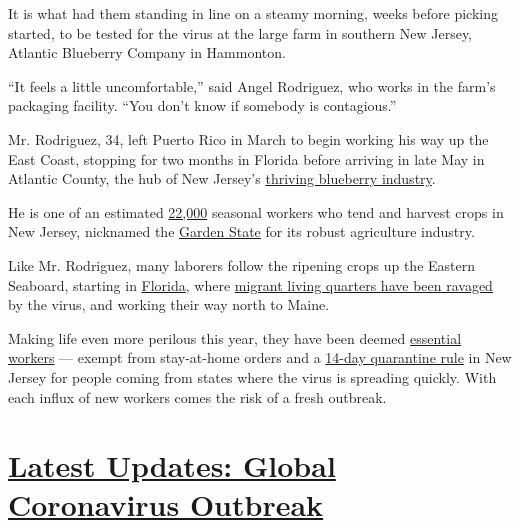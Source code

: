 It is what had them standing in line on a steamy morning, weeks before
picking started, to be tested for the virus at the large farm in
southern New Jersey, Atlantic Blueberry Company in Hammonton.

``It feels a little uncomfortable,'' said Angel Rodriguez, who works in
the farm's packaging facility. ``You don't know if somebody is
contagious.''

Mr. Rodriguez, 34, left Puerto Rico in March to begin working his way up
the East Coast, stopping for two months in Florida before arriving in
late May in Atlantic County, the hub of New Jersey's
\href{https://www.nj.gov/agriculture/news/press/2019/approved/press190701.html\#:~:text=Blueberries\%20were\%20the\%20No.,on\%209\%2C000\%20acres\%20last\%20year.}{thriving
blueberry industry}.

He is one of an estimated
\href{https://www.ncbi.nlm.nih.gov/pmc/articles/PMC4040280/\#R10}{22,000}
seasonal workers who tend and harvest crops in New Jersey, nicknamed the
\href{https://www.state.nj.us/nj/about/facts/nickname/\#:~:text=Abraham\%20Browning\%20of\%20Camden\%20is,the\%20nickname\%20the\%20Garden\%20State.\&text=Browning\%20said\%20that\%20our\%20Garden,The\%20name\%20stuck\%20ever\%20since.}{Garden
State} for its robust agriculture industry.

Like Mr. Rodriguez, many laborers follow the ripening crops up the
Eastern Seaboard, starting in
\href{https://www.nytimes3xbfgragh.onion/2020/06/25/us/coronavirus-florida-texas-california-arizona.html}{Florida},
where
\href{https://www.nytimes3xbfgragh.onion/2020/06/18/us/florida-coronavirus-immokalee-farmworkers.html}{migrant
living quarters have been ravaged} by the virus, and working their way
north to Maine.

Making life even more perilous this year, they have been deemed
\href{https://www.cisa.gov/sites/default/files/publications/CISA-Guidance-on-Essential-Critical-Infrastructure-Workers-1-20-508c.pdf}{essential
workers} --- exempt from stay-at-home orders and a
\href{https://www.nytimes3xbfgragh.onion/2020/06/24/nyregion/ny-coronavirus-states-quarantine.html?referringSource=articleShare}{14-day
quarantine rule} in New Jersey for people coming from states where the
virus is spreading quickly. With each influx of new workers comes the
risk of a fresh outbreak.

\hypertarget{latest-updates-global-coronavirus-outbreak}{%
\section{\texorpdfstring{\href{https://www.nytimes3xbfgragh.onion/2020/08/01/world/coronavirus-covid-19.html?action=click\&pgtype=Article\&state=default\&region=MAIN_CONTENT_1\&context=storylines_live_updates}{Latest
Updates: Global Coronavirus
Outbreak}}{Latest Updates: Global Coronavirus Outbreak}}\label{latest-updates-global-coronavirus-outbreak}}

